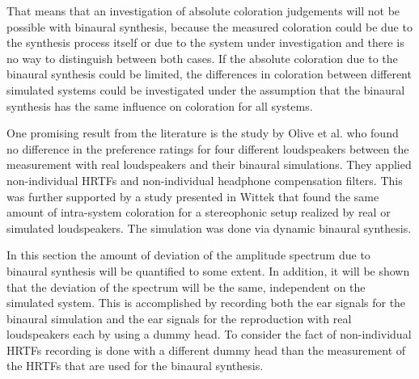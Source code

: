 That means that an investigation of absolute coloration judgements will not be
possible with binaural synthesis, because the measured coloration could be due to
the synthesis process itself or due to the system under investigation and there
is no way to distinguish between both cases. If the absolute coloration due to
the binaural synthesis could be limited, the differences in coloration between
different simulated systems could be investigated under the assumption that the
binaural synthesis has the same influence on coloration for all systems.

One promising result from the literature is the study by Olive et
al.\autocite{Olive2007} who found no difference in the preference ratings for
four different loudspeakers between the measurement with real loudspeakers and
their binaural simulations. They applied non-individual \acp{HRTF} and non-individual
headphone compensation filters.
This was further supported by a study presented in
Wittek\autocite[][Fig.\,8.4]{Wittek2007} that found the same amount of
intra-system coloration for a stereophonic setup realized by real or simulated
loudspeakers. The simulation was done via dynamic binaural synthesis.

In this section the amount of deviation of the amplitude spectrum due to
binaural synthesis will be quantified to some extent. In addition, it will be
shown that the deviation of the spectrum will be the same, independent on the
simulated system. This is accomplished by recording both the ear signals for
the binaural simulation and the ear signals for the reproduction with real
loudspeakers each by using a dummy head. To consider the fact of
non-individual \acp{HRTF} recording is done with a different dummy head than the
measurement of the \acp{HRTF} that are used for the binaural synthesis.

